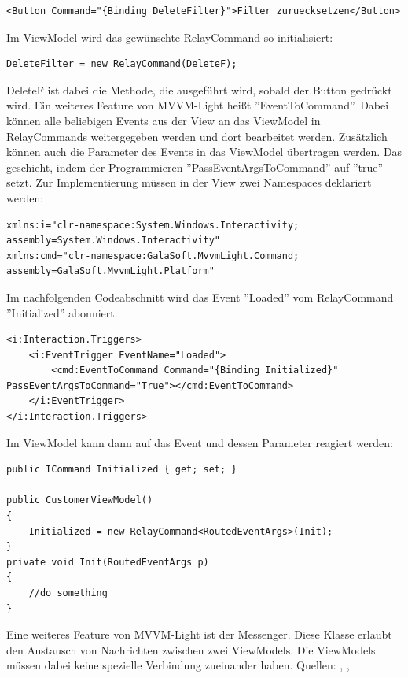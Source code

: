 \begin{lstlisting}
<Button Command="{Binding DeleteFilter}">Filter zuruecksetzen</Button>
\end{lstlisting}
\newpage \noindent Im ViewModel wird das gewünschte RelayCommand so initialisiert:
\begin{lstlisting}
DeleteFilter = new RelayCommand(DeleteF);
\end{lstlisting}
DeleteF ist dabei die Methode, die ausgeführt wird, sobald der Button gedrückt wird. \newline Ein weiteres Feature von MVVM-Light heißt ''EventToCommand''. Dabei können alle beliebigen Events aus der View an das ViewModel in RelayCommands weitergegeben werden und dort bearbeitet werden. Zusätzlich können auch die Parameter des Events in das ViewModel übertragen werden. Das geschieht, indem der Programmieren ''PassEventArgsToCommand'' auf ''true'' setzt. Zur Implementierung müssen in der View zwei Namespaces deklariert werden:
\begin{lstlisting}
xmlns:i="clr-namespace:System.Windows.Interactivity;
assembly=System.Windows.Interactivity"
xmlns:cmd="clr-namespace:GalaSoft.MvvmLight.Command;
assembly=GalaSoft.MvvmLight.Platform"
\end{lstlisting}
Im nachfolgenden Codeabschnitt wird das Event ''Loaded'' vom RelayCommand ''Initialized'' abonniert.
\begin{lstlisting}
<i:Interaction.Triggers>
	<i:EventTrigger EventName="Loaded">
		<cmd:EventToCommand Command="{Binding Initialized}" PassEventArgsToCommand="True"></cmd:EventToCommand>
	</i:EventTrigger>
</i:Interaction.Triggers>
\end{lstlisting}
Im ViewModel kann dann auf das Event und dessen Parameter reagiert werden:
\begin{lstlisting}
public ICommand Initialized { get; set; }

public CustomerViewModel()
{
	Initialized = new RelayCommand<RoutedEventArgs>(Init);
}
private void Init(RoutedEventArgs p)
{
	//do something
}
\end{lstlisting}
Eine weiteres Feature von MVVM-Light ist der Messenger. Diese Klasse erlaubt den Austausch von Nachrichten zwischen zwei ViewModels. Die ViewModels müssen dabei keine spezielle Verbindung zueinander haben.
\newline Quellen: \cite{dotnetcurry_using_2018}, \cite{dotnetpattern_mvvm_2018}, \cite{microsoft_mvvm_2018}
